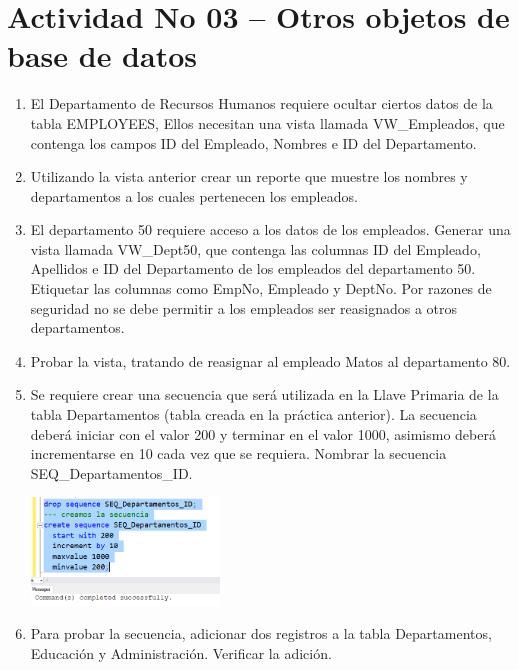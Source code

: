 \section{Actividad No 03 –  Otros objetos de base de datos} 
		
\begin{enumerate}[1.]
	\item El Departamento de Recursos Humanos requiere ocultar ciertos datos de la tabla EMPLOYEES, Ellos necesitan una vista llamada VW\_Empleados, que contenga los campos ID del Empleado, Nombres e ID del Departamento.
	\item Utilizando la vista anterior crear un reporte que muestre los nombres y departamentos a los cuales
pertenecen los empleados.
	\item El departamento 50 requiere acceso a los datos de los empleados. Generar una vista llamada VW\_Dept50, que contenga las columnas ID del Empleado, Apellidos e ID del Departamento de los empleados del departamento 50. Etiquetar las columnas como EmpNo, Empleado y DeptNo. Por razones de seguridad no se debe permitir a los empleados ser reasignados a otros departamentos.
	\item Probar la vista, tratando de reasignar al empleado Matos al departamento 80.
	\item Se requiere crear una secuencia que será utilizada en la Llave Primaria de la tabla Departamentos (tabla creada en la práctica anterior). La secuencia deberá iniciar con el valor 200 y terminar en el valor 1000, asimismo deberá incrementarse en 10 cada vez que se requiera. Nombrar la secuencia SEQ\_Departamentos\_ID.

	\begin{center}
	\includegraphics[width=5cm]{./Imagenes/actividad_03_05} 
	\end{center}

	\item Para probar la secuencia, adicionar dos registros a la tabla Departamentos, Educación y Administración. Verificar la adición.


\end{enumerate}

